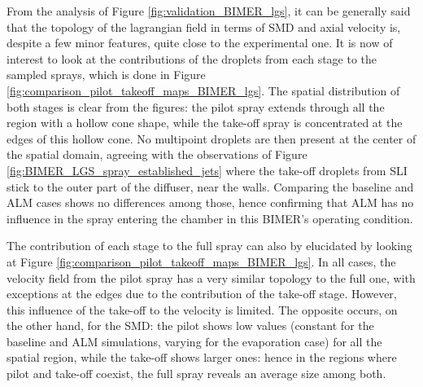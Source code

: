 From the analysis of Figure \ref{fig:validation_BIMER_lgs}, it can be generally said that the topology of the lagrangian field in terms of SMD and axial velocity is, despite a few minor features, quite close to the experimental one. It is now of interest to look at the contributions of the droplets from each stage to the sampled sprays, which is done in Figure \ref{fig:comparison_pilot_takeoff_maps_BIMER_lgs}. The spatial distribution of both stages is clear from the figures: the pilot spray extends through all the region with a hollow cone shape, while the take-off spray is concentrated at the edges of this hollow cone. No multipoint droplets are then present at the center of the spatial domain, agreeing with the observations of Figure \ref{fig:BIMER_LGS_spray_established_jets} where the take-off droplets from SLI stick to the outer part of the diffuser, near the walls. Comparing the baseline and ALM cases shows no differences among those, hence confirming that ALM has no influence in the spray entering the chamber in this BIMER's operating condition. 

The contribution of each stage to the full spray can also by elucidated by looking at Figure \ref{fig:comparison_pilot_takeoff_maps_BIMER_lgs}. In all cases, the velocity field from the pilot spray has a very similar topology to the full one, with exceptions at the edges due to the contribution of the take-off stage. However, this influence of the take-off to the velocity is limited. The opposite occurs, on the other hand, for the SMD: the pilot shows low values (constant for the baseline and ALM simulations, varying for the evaporation case) for all the spatial region, while the take-off shows larger ones: hence in the regions where pilot and take-off coexist, the full spray reveals an average size among both. %


